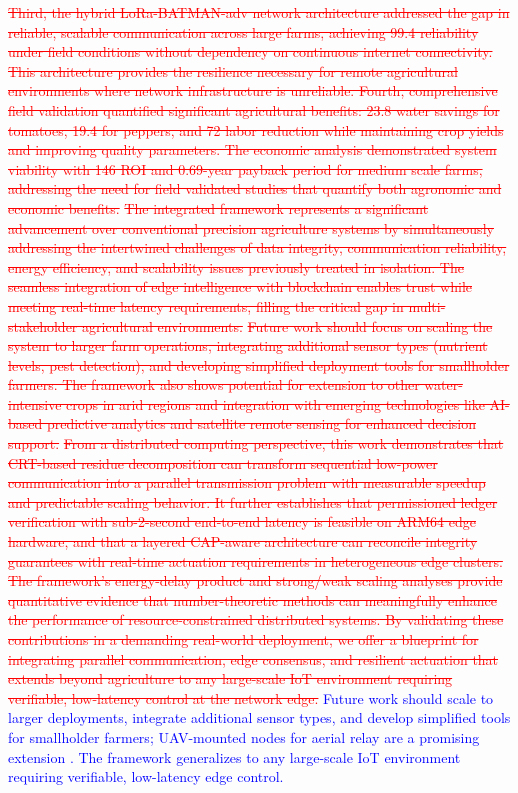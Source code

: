 \documentclass[pdflatex,sn-mathphys-num]{sn-jnl}
\theoremstyle{thmstyleone}
\theoremstyle{thmstyletwo}
\theoremstyle{thmstylethree}
\begin{document}
{\textcolor{red}{\sout{Third, the hybrid LoRa-BATMAN-adv network architecture addressed the gap in reliable, scalable communication across large farms, achieving 99.4 reliability under field conditions without dependency on continuous internet connectivity. This architecture provides the resilience necessary for remote agricultural environments where network infrastructure is unreliable. Fourth, comprehensive field validation quantified significant agricultural benefits: 23.8 water savings for tomatoes, 19.4 for peppers, and 72 labor reduction while maintaining crop yields and improving quality parameters. The economic analysis demonstrated system viability with 146 ROI and 0.69-year payback period for medium scale farms, addressing the need for field validated studies that quantify both agronomic and economic benefits.}}
\textcolor{red}{\sout{The integrated framework represents a significant advancement over conventional precision agriculture systems by simultaneously addressing the intertwined challenges of data integrity, communication reliability, energy efficiency, and scalability issues previously treated in isolation. The seamless integration of edge intelligence with blockchain enables trust while meeting real-time latency requirements, filling the critical gap in multi-stakeholder agricultural environments.}}
\textcolor{red}{\sout{Future work should focus on scaling the system to larger farm operations, integrating additional sensor types (nutrient levels, pest detection), and developing simplified deployment tools for smallholder farmers. The framework also shows potential for extension to other water-intensive crops in arid regions and integration with emerging technologies like AI-based predictive analytics and satellite remote sensing for enhanced decision support.}}
\textcolor{red}{\sout{From a distributed computing perspective, this work demonstrates that CRT-based residue decomposition can transform sequential low-power communication into a parallel transmission problem with measurable speedup and predictable scaling behavior. It further establishes that permissioned ledger verification with sub-2-second end-to-end latency is feasible on ARM64 edge hardware, and that a layered CAP-aware architecture can reconcile integrity guarantees with real-time actuation requirements in heterogeneous edge clusters. The framework's energy-delay product and strong/weak scaling analyses provide quantitative evidence that number-theoretic methods can meaningfully enhance the performance of resource-constrained distributed systems. By validating these contributions in a demanding real-world deployment, we offer a blueprint for integrating parallel communication, edge consensus, and resilient actuation that extends beyond agriculture to any large-scale IoT environment requiring verifiable, low-latency control at the network edge.}}
\textcolor{blue}{Future work should scale to larger deployments, integrate additional sensor types, and develop simplified tools for smallholder farmers; UAV-mounted nodes for aerial relay are a promising extension \cite{secure2024drone}. The framework generalizes to any large-scale IoT environment requiring verifiable, low-latency edge control.}

}
\end{document}
